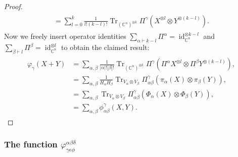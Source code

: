 \documentclass[notitlepage, 11pt, letterpaper]{amsart}
\theoremstyle{plain}
\theoremstyle{definition}
\DeclareMathOperator{\Tr}{Tr}
\DeclareMathOperator{\id}{id}
\newcommand{\ot}{\otimes} %
\newcommand{\vp}{\varphi} %
\newcommand{\ya}{\alpha}
\newcommand{\yb}{\beta}
\newcommand{\yc}{\gamma}
\newcommand{\yd}{\delta}
\newcommand{\ye}{\epsilon}
\newcommand{\yf}{\phi}
\newcommand{\sya}{|\ya|}
\newcommand{\syb}{|\yb|}
\begin{document}
\begin{proof}
\begin{align}
\begin{split}
            = \sum_{l=0}^k \frac{1}{l! (k-l)!} \Tr_{(\mathbb{C}^n)^{\ot k}} \Pi^\yc (X^{\ot l} \ot Y^{\ot (k-l)}).
        \end{split}
    \end{align}
    Now we freely insert operator identities $\sum_{\ya \vdash k-l} \Pi^{\ya} = \id_{\mathbb C^n}^{\otimes k-l}$ and $\sum_{\yb \vdash l} \Pi^{\yb} = \id_{\mathbb C^n}^{\otimes l}$ to obtain the claimed result:
    \begin{align}
        \begin{split}
            \vp_\yc(X+Y)
            &= \sum_{\ya, \yb}  \frac{1}{\sya! \syb!} \Tr_{(\mathbb{C}^n)^{\ot k}} \Pi^\yc (\Pi^{\ya}X^{\ot l} \ot \Pi^{\yb} Y^{\ot (k-l)}), \\
            &= \sum_{\ya, \yb}  \frac{1}{H_\ya H_\yb} \Tr_{V_\ya \ot V_\yb} \Pi_{\ya \yb}^\yc  (\pi_\ya(X) \ot \pi_\yb(Y)), \\
            &= \sum_{\ya, \yb}  \Tr_{V_\ya \ot V_\yb} \Pi_{\ya \yb}^\yc  (\Phi_\ya(X) \ot \Phi_\yb(Y)), \\
            &= \sum_{\ya, \yb}  \yf_{\ya \yb}^\yc(X,Y).
        \end{split}
    \end{align}
\end{proof}

\subsubsection{The function \texorpdfstring{$\vp^{\ya \yb \yd}_{\yc \ye \yf}$}{phiabcdef}}
\end{document}
